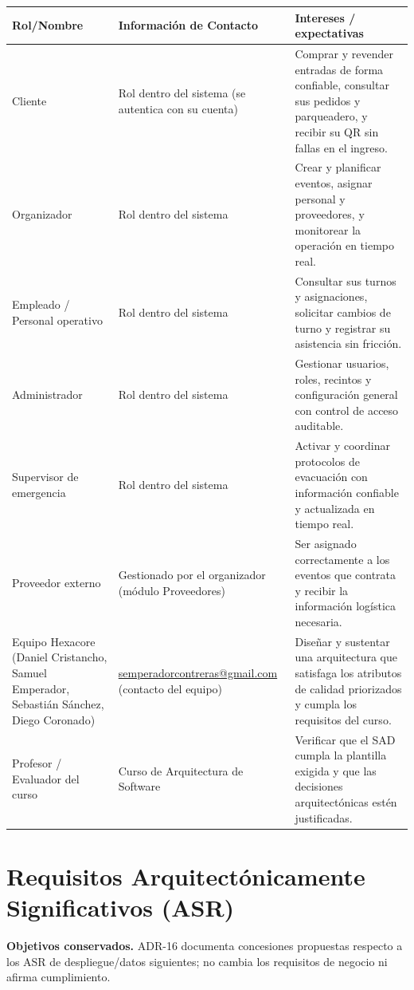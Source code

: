 \documentclass[11pt,a4paper]{article}
\begin{document}
\begin{center}
\begin{longtable}{|p{3.6cm}|p{3.8cm}|p{6.9cm}|}
\hline
\textbf{Rol/Nombre} & \textbf{Información de Contacto} & \textbf{Intereses / expectativas} \\
\hline
\endhead
Cliente & Rol dentro del sistema (se autentica con su cuenta) & Comprar y revender entradas de
forma confiable, consultar sus pedidos y parqueadero, y recibir su QR sin fallas en el ingreso.\\
\hline
Organizador & Rol dentro del sistema & Crear y planificar eventos, asignar personal y
proveedores, y monitorear la operación en tiempo real.\\
\hline
Empleado / Personal operativo & Rol dentro del sistema & Consultar sus turnos y asignaciones,
solicitar cambios de turno y registrar su asistencia sin fricción.\\
\hline
Administrador & Rol dentro del sistema & Gestionar usuarios, roles, recintos y configuración
general con control de acceso auditable.\\
\hline
Supervisor de emergencia & Rol dentro del sistema & Activar y coordinar protocolos de evacuación
con información confiable y actualizada en tiempo real.\\
\hline
Proveedor externo & Gestionado por el organizador (módulo Proveedores) & Ser asignado
correctamente a los eventos que contrata y recibir la información logística necesaria.\\
\hline
Equipo Hexacore (Daniel Cristancho, Samuel Emperador, Sebastián Sánchez, Diego Coronado) &
\url{semperadorcontreras@gmail.com} (contacto del equipo) & Diseñar y sustentar una arquitectura que
satisfaga los atributos de calidad priorizados y cumpla los requisitos del curso.\\
\hline
Profesor / Evaluador del curso & Curso de Arquitectura de Software & Verificar que el SAD cumpla
la plantilla exigida y que las decisiones arquitectónicas estén justificadas.\\
\hline
\end{longtable}
\end{center}

\section{Requisitos Arquitectónicamente Significativos (ASR)}
\textbf{Objetivos conservados.} ADR-16 documenta concesiones propuestas respecto a los
ASR de despliegue/datos siguientes; no cambia los requisitos de negocio ni afirma cumplimiento.
\end{document}
